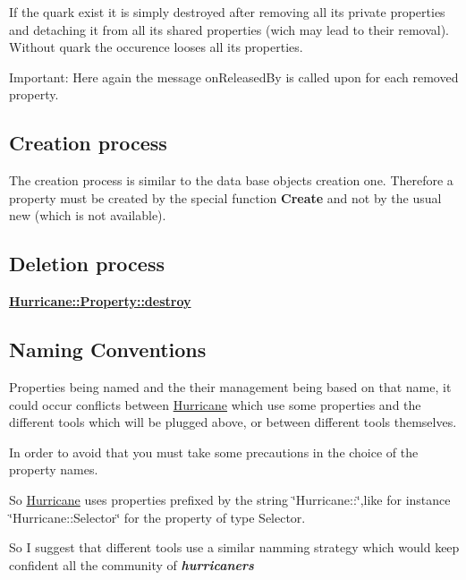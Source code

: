 If the quark exist it is simply destroyed after removing all its private properties and detaching it from all its shared properties (wich may lead to their removal). Without quark the occurence looses all its properties.

\begin{DoxyParagraph}{Important\+: Here again the message on\+Released\+By is called upon for }
each removed property.
\end{DoxyParagraph}
\hypertarget{classHurricane_1_1Property_secPropertyCreationProcess}{}\subsection{Creation process}\label{classHurricane_1_1Property_secPropertyCreationProcess}
The creation process is similar to the data base objects creation one. Therefore a property must be created by the special function {\bfseries Create} and not by the usual new (which is not available).\hypertarget{classHurricane_1_1Property_secPropertyDeletionProcess}{}\subsection{Deletion process}\label{classHurricane_1_1Property_secPropertyDeletionProcess}
{\bfseries \mbox{\hyperlink{classHurricane_1_1Property_ab60362699e6c6ea35ace45dbd1075a2f}{Hurricane\+::\+Property\+::destroy}}}\hypertarget{classHurricane_1_1Property_secPropertyNaming}{}\subsection{Naming Conventions}\label{classHurricane_1_1Property_secPropertyNaming}
Properties being named and the their management being based on that name, it could occur conflicts between \mbox{\hyperlink{namespaceHurricane}{Hurricane}} which use some properties and the different tools which will be plugged above, or between different tools themselves.

In order to avoid that you must take some precautions in the choice of the property names.

So \mbox{\hyperlink{namespaceHurricane}{Hurricane}} uses properties prefixed by the string \char`\"{}\+Hurricane\+::\char`\"{},like for instance \char`\"{}\+Hurricane\+::\+Selector\char`\"{} for the property of type Selector.

So I suggest that different tools use a similar namming strategy which would keep confident all the community of {\bfseries {\itshape hurricaners}}

